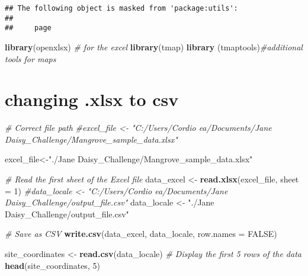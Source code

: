 \documentclass[
]{article}
\newenvironment{Shaded}{\begin{snugshade}}{\end{snugshade}}
\newcommand{\AttributeTok}[1]{\textcolor[rgb]{0.13,0.29,0.53}{#1}}
\newcommand{\CommentTok}[1]{\textcolor[rgb]{0.56,0.35,0.01}{\textit{#1}}}
\newcommand{\ConstantTok}[1]{\textcolor[rgb]{0.56,0.35,0.01}{#1}}
\newcommand{\DecValTok}[1]{\textcolor[rgb]{0.00,0.00,0.81}{#1}}
\newcommand{\FunctionTok}[1]{\textcolor[rgb]{0.13,0.29,0.53}{\textbf{#1}}}
\newcommand{\NormalTok}[1]{#1}
\newcommand{\OtherTok}[1]{\textcolor[rgb]{0.56,0.35,0.01}{#1}}
\newcommand{\StringTok}[1]{\textcolor[rgb]{0.31,0.60,0.02}{#1}}
\begin{document}
\begin{verbatim}
## The following object is masked from 'package:utils':
## 
##     page
\end{verbatim}

\begin{Shaded}
\begin{Highlighting}[]
\FunctionTok{library}\NormalTok{(openxlsx) }\CommentTok{\# for the excel}
\FunctionTok{library}\NormalTok{(tmap)}
\FunctionTok{library}\NormalTok{ (tmaptools)}\CommentTok{\#additional tools for maps}
\end{Highlighting}
\end{Shaded}

\section{changing .xlsx to csv}\label{changing-.xlsx-to-csv}

\begin{Shaded}
\begin{Highlighting}[]
\CommentTok{\# Correct file path}
\CommentTok{\#excel\_file \textless{}{-} "C:/Users/Cordio ea/Documents/Jane Daisy\_Challenge/Mangrove\_sample\_data.xlsx"}


\NormalTok{excel\_file}\OtherTok{\textless{}{-}}\StringTok{"./Jane Daisy\_Challenge/Mangrove\_sample\_data.xlsx"}

\CommentTok{\# Read the first sheet of the Excel file}
\NormalTok{data\_excel }\OtherTok{\textless{}{-}} \FunctionTok{read.xlsx}\NormalTok{(excel\_file, }\AttributeTok{sheet =} \DecValTok{1}\NormalTok{)}
\CommentTok{\#data\_locale \textless{}{-} "C:/Users/Cordio ea/Documents/Jane Daisy\_Challenge/output\_file.csv"}
\NormalTok{data\_locale }\OtherTok{\textless{}{-}} \StringTok{"./Jane Daisy\_Challenge/output\_file.csv"}

\CommentTok{\# Save as CSV}
\FunctionTok{write.csv}\NormalTok{(data\_excel, data\_locale, }\AttributeTok{row.names =} \ConstantTok{FALSE}\NormalTok{)}


\NormalTok{site\_coordinates }\OtherTok{\textless{}{-}} \FunctionTok{read.csv}\NormalTok{(data\_locale)}
\CommentTok{\# Display the first 5 rows of the data}
\FunctionTok{head}\NormalTok{(site\_coordinates, }\DecValTok{5}\NormalTok{)}
\end{Highlighting}
\end{Shaded}
\end{document}
